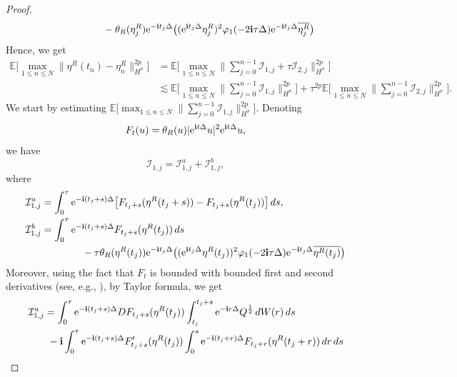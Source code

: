 \documentclass[a4paper]{amsart}
\begin{document}
\begin{proof}
\begin{align*}
   &\hspace{2cm} - \theta_R(\eta^R_j){\rm e}^{-{\bf i}t_j\Delta}\big(({\rm e}^{{\bf i}t_j\Delta} \eta^R_j)^2 \varphi_1(-2{\bf i}\tau\Delta){\rm e}^{-{\bf i}t_j\Delta} \overline{\eta_j^R}\big)
     \end{align*}
    Hence, we get
    \begin{align*}
        \mathbb{E}\big[\max_{1\le n\le N}\|\eta^R(t_n)-\eta^R_n\|^{2p}_{H^\sigma}\big]& = \mathbb{E}\big[\max_{1\le n\le N}\|\sum_{j=0}^{n-1}\mathcal{I}_{1,j}+\tau \mathcal{I}_{2,j}\|^{2p}_{H^\sigma}\big]\\
    &\lesssim \mathbb{E}\big[\max_{1\le n\le N}\|\sum_{j=0}^{n-1}\mathcal{I}_{1,j}\|^{2p}_{H^\sigma}\big]+\tau^{2p}\mathbb{E}\big[\max_{1\le n\le N}\|\sum_{j=0}^{n-1}\mathcal{I}_{2,j}\|^{2p}_{H^\sigma}\big].
    \end{align*}
    We start by estimating $\mathbb{E}\big[\max_{1\le n\le N}\|\sum_{j=0}^{n-1}\mathcal{I}_{1,j}\|^{2p}_{H^\sigma}\big]$. Denoting $$F_{t}(u)=\theta_R(u)|{\rm e}^{{\bf i}t\Delta}u|^2 {\rm e}^{{\bf i}t\Delta}u,$$ we have
    $$
    \mathcal{I}_{1,j}=\mathcal{I}^a_{1,j}+\mathcal{I}^b_{1,j},
    $$
    where
    \begin{align*}
    &\mathcal{I}^a_{1,j}=\int_0^\tau {\rm e}^{-{\bf i}(t_j+s)\Delta}\big[ F_{t_j+s}(\eta^R(t_j+s))-F_{t_j+s}(\eta^R(t_j))\big]\,ds,\\
    &\mathcal{I}^b_{1,j}=\int_0^\tau {\rm e}^{-{\bf i}(t_j+s)\Delta}F_{t_j+s}(\eta^R(t_j))\,ds\\
    &\hspace{2cm}-\tau\theta_R(\eta^R(t_j)){\rm e}^{-{\bf i}t_j\Delta}\big(({\rm e}^{{\bf i}t_j\Delta} \eta^R(t_j))^2 \varphi_1(-2{\bf i}\tau\Delta){\rm e}^{-{\bf i}t_j\Delta} \overline{\eta^R(t_j)}\big)
        \end{align*}
    Moreover, using the fact that $F_t$ is bounded with bounded first and second derivatives (see, e.g., \cite{deb0}), by Taylor formula, we get
    \begin{align*}
        \mathcal{I}^a_{1,j}&=\int_0^\tau {\rm e}^{-{\bf i}(t_j+s)\Delta} DF_{t_j+s}(\eta^R(t_j)) \int_{t_j}^{t_j+s}{\rm e}^{-{\bf i}r\Delta}Q^{\frac{1}{2}}\,dW(r)\,ds\\
        &\ -{\bf i}\int_0^\tau {\rm e}^{-{\bf i}(t_j+s)\Delta} F'_{t_j+s}(\eta^R(t_j)) \int_0^s {\rm e}^{-{\bf i}(t_j+r)\Delta} F_{t_j+r}(\eta^R(t_j+r))\,dr\,ds\\

\end{align*}
\end{proof}
\end{document}
